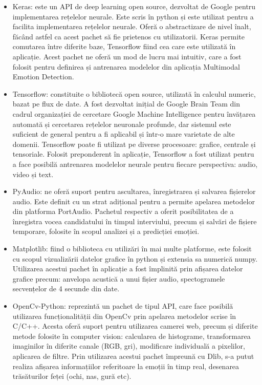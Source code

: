 \documentclass[a4paper, 12pt]{report}
\begin{document}
	\begin{itemize}
	 	\item Keras: este un API de deep learning open source, dezvoltat de Google pentru implementarea rețelelor neurale. Este scris în python și este utilizat pentru a facilita implementarea rețelelor neurale. Oferă o abstractizare de nivel înalt, făcând astfel ca acest pachet să fie prietenos cu utilizatorii. Keras permite comutarea între diferite baze, Tensorflow fiind cea care este utilizată în aplicație. Acest pachet ne oferă un mod de lucru mai intuitiv, care a fost folosit pentru definirea și antrenarea modelelor din aplicația Multimodal Emotion Detection.
	
		\item Tensorflow: constituite o bibliotecă open source, utilizată în calculul numeric, bazat pe flux de date. A fost dezvoltat inițial de Google Brain Team din cadrul organizației de cercetare Google Machine Intelligence pentru învățarea automată și cercetarea rețelelor neuronale profunde, dar sistemul este suficient de general pentru a fi aplicabil și într-o mare varietate de alte domenii. Tensorflow poate fi utilizat pe diverse procesoare: grafice, centrale și tensoriale. Folosit preponderent în aplicație, Tensorflow a fost utilizat pentru a face posibilă antrenarea modelelor neurale pentru fiecare perspectiva: audio, video și text.
	
		\item PyAudio: ne oferă suport pentru ascultarea, înregistrarea și salvarea fișierelor audio. Este definit cu un strat adițional pentru a permite apelarea metodelor din platforma PortAudio. Pachetul respectiv a oferit posibilitatea de a înregistra vocea candidatului în timpul interviului, precum și salvări de fișiere temporare, folosite în scopul analizei și a predicției emoției.
	
		\item Matplotlib: fiind o biblioteca cu utilizări în mai multe platforme, este folosit cu scopul vizualizării datelor grafice în python și extensia sa numerică numpy. Utilizarea acestui pachet în aplicație a fost împlinită prin afișarea datelor grafice precum: anvelopa acustică a unui fișier audio, spectogramele secvențelor de 4 secunde din date.
	
		\item OpenCv-Python: reprezintă un pachet de tipul API, care face posibilă utilizarea funcționalității din OpenCv prin apelarea metodelor scrise în C/C++. Acesta oferă suport pentru utilizarea camerei web, precum și diferite metode folosite în computer vision: calcularea de histograme, transformarea imaginilor în diferite canale (RGB, gri), modificare individuală a pixelilor, aplicarea de filtre. Prin utilizarea acestui pachet împreună cu Dlib, s-a putut realiza afișarea informațiilor referitoare la emoții în timp real, desenarea trăsăturilor feței (ochi, nas, gură etc).
	

\end{itemize}
\end{document}
